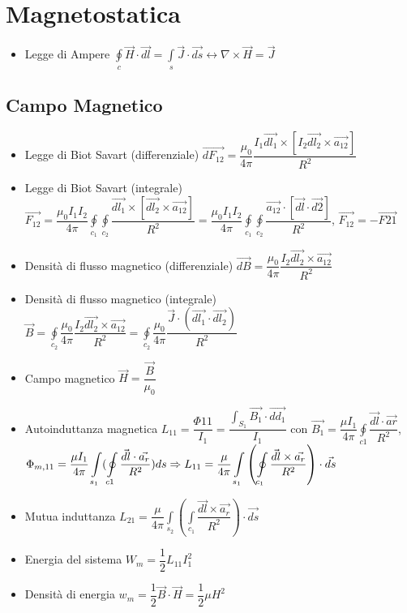 \documentclass{article}
\begin{document}
\newpage

\section{Magnetostatica}
\begin{itemize}
	\item Legge di Ampere \( \displaystyle \oint\limits_{c} \vec{H} \cdot \vec{dl} = \int\limits_{s} \vec{J} \cdot \vec{ds} \leftrightarrow \nabla \times \vec{H} = \vec{J} \)
\end{itemize}

\subsection{Campo Magnetico}
\begin{itemize}
	\item Legge di Biot Savart (differenziale) \( \vec{dF_{12}} = \dfrac{\mu_0}{4 \pi} \dfrac{I_1 \vec{dl_1} \times [I_2 \vec{dl_2} \times \vec{a_{12}}] }{R^2} \)
	\item Legge di Biot Savart (integrale) \(\displaystyle \vec{F_{12}} = \dfrac{\mu_0 I_1 I_2}{4 \pi} \oint\limits_{c_1} \oint\limits_{c_2} \dfrac{\vec{dl_1} \times [\vec{dl_2} \times \vec{a_{12}}]} {R^2} = \dfrac{\mu_0 I_1 I_2}{4 \pi} \oint\limits_{c_1} \oint\limits_{c_2} \dfrac{\vec{a_{12}} \cdot [\vec{dl} \cdot \vec{d2}]} {R^2} \), \(\vec{F_{12}} = - \vec{F{21}} \)
	\item Densità di flusso magnetico (differenziale) \( \vec{dB} = \dfrac{\mu_0}{4 \pi} \dfrac{I_2 \vec{dl_2} \times \vec{a_{12}}}{R^2} \)
	\item Densità di flusso magnetico (integrale) \(\displaystyle \vec{B} = \oint\limits_{c_2} \dfrac{\mu_0}{4 \pi} \dfrac{I_2 \vec{dl_2} \times \vec{a_{12}}}{R^2} = \oint\limits_{c_2} \dfrac{\mu_0}{4 \pi} \dfrac{\vec{J} \cdot ( \vec{dl_{1}} \cdot \vec{dl_2} )}{R^2}\)
	\item Campo magnetico \( \vec{H} = \dfrac{\vec{B}}{\mu_0} \)
	\item Autoinduttanza magnetica \(L_{11} = \dfrac{\Phi{11}}{I_1} = \dfrac{\displaystyle  \int_{S_1} \vec{B_1} \cdot \vec{dd_1}}{I_1} \) con \( \vec{B_1} = \dfrac{\mu I_1}{4 \pi} \displaystyle \oint\limits_{c1} \dfrac{\vec{dl} \cdot \vec{ar}}{R^2} \), \(\displaystyle \Phi_{m, 11} = \dfrac{\mu I_1}{4 \pi} \int\limits_{s_1} ( \oint\limits_{c1} \dfrac{\vec{dl} \cdot \vec{a_r}}{R^2}) ds \linebreak \Rightarrow L_{11} = \dfrac{\mu}{4 \pi} \displaystyle\int\limits_{s_1} \left( \oint\limits_{c_1} \dfrac{\vec{dl} \times \vec{a_r}}{R^2} \right) \cdot \vec{ds}\)
	\item Mutua induttanza \(\displaystyle L_{21} = \dfrac{\mu}{4 \pi} \int\limits_{s_2} \left( \int\limits_{c_1} \dfrac{\vec{dl} \times \vec{a_r}}{R^2} \right) \cdot \vec{ds} \)
	\item Energia del sistema \( W_m = \dfrac{1}{2} L_{11} I_1^2 \)
	\item Densità di energia  \( w_m = \dfrac{1}{2} \vec{B} \cdot \vec{H} = \dfrac{1}{2} \mu H^2 \)
\end{itemize}
\end{document}
